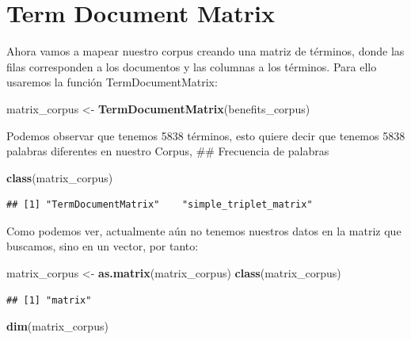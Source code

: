 \documentclass[spanish,]{article}
\newenvironment{Shaded}{\begin{snugshade}}{\end{snugshade}}
\newcommand{\KeywordTok}[1]{\textcolor[rgb]{0.13,0.29,0.53}{\textbf{#1}}}
\newcommand{\NormalTok}[1]{#1}
\newcommand{\StringTok}[1]{\textcolor[rgb]{0.31,0.60,0.02}{#1}}
\begin{document}
\hypertarget{term-document-matrix}{%
\section{Term Document Matrix}\label{term-document-matrix}}

Ahora vamos a mapear nuestro corpus creando una matriz de términos,
donde las filas corresponden a los documentos y las columnas a los
términos. Para ello usaremos la función TermDocumentMatrix:

\begin{Shaded}
\begin{Highlighting}[]
\NormalTok{matrix_corpus <-}\StringTok{ }\KeywordTok{TermDocumentMatrix}\NormalTok{(benefits_corpus)}
\end{Highlighting}
\end{Shaded}

Podemos observar que tenemos 5838 términos, esto quiere decir que
tenemos 5838 palabras diferentes en nuestro Corpus, \#\# Frecuencia de
palabras

\begin{Shaded}
\begin{Highlighting}[]
\KeywordTok{class}\NormalTok{(matrix_corpus)}
\end{Highlighting}
\end{Shaded}

\begin{verbatim}
## [1] "TermDocumentMatrix"    "simple_triplet_matrix"
\end{verbatim}

Como podemos ver, actualmente aún no tenemos nuestros datos en la matriz
que buscamos, sino en un vector, por tanto:

\begin{Shaded}
\begin{Highlighting}[]
\NormalTok{matrix_corpus <-}\StringTok{ }\KeywordTok{as.matrix}\NormalTok{(matrix_corpus)}
\KeywordTok{class}\NormalTok{(matrix_corpus)}
\end{Highlighting}
\end{Shaded}

\begin{verbatim}
## [1] "matrix"
\end{verbatim}

\begin{Shaded}
\begin{Highlighting}[]
\KeywordTok{dim}\NormalTok{(matrix_corpus) }
\end{Highlighting}
\end{Shaded}
\end{document}
